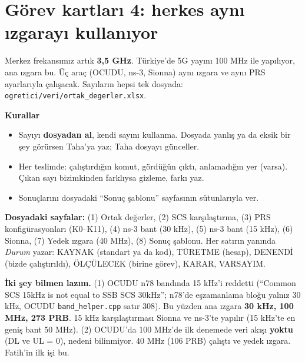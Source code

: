 \documentclass[11pt,a4paper]{article}
\begin{document}
\section*{Görev kartları 4: herkes aynı ızgarayı kullanıyor}
{\sffamily\color{muted} Merkez frekansımız artık \textbf{3,5 GHz}. Türkiye'de 5G yayını 100 MHz ile yapılıyor, ana ızgara bu. Üç araç (OCUDU, ns-3, Sionna) aynı ızgara ve aynı PRS ayarlarıyla çalışacak. Sayıların hepsi tek dosyada: \texttt{ogretici/veri/ortak\_degerler.xlsx}.}

\textbf{Kurallar}
\begin{itemize}[leftmargin=1.4em]
\item Sayıyı \textbf{dosyadan al}, kendi sayını kullanma. Dosyada yanlış ya da eksik bir şey görürsen Taha'ya yaz; Taha dosyayı günceller.
\item Her teslimde: çalıştırdığın komut, gördüğün çıktı, anlamadığın yer (varsa). Çıkan sayı bizimkinden farklıysa gizleme, farkı yaz.
\item Sonuçlarını dosyadaki ``Sonuç şablonu'' sayfasının sütunlarıyla ver.
\end{itemize}

\textbf{Dosyadaki sayfalar:} (1) Ortak değerler, (2) SCS karşılaştırma, (3) PRS konfigürasyonları (K0--K11), (4) ns-3 bant (30 kHz), (5) ns-3 bant (15 kHz), (6) Sionna, (7) Yedek ızgara (40 MHz), (8) Sonuç şablonu. Her satırın yanında \emph{Durum} yazar: KAYNAK (standart ya da kod), TÜRETME (hesap), DENENDİ (bizde çalıştırıldı), ÖLÇÜLECEK (birine görev), KARAR, VARSAYIM.

\begin{tcolorbox}[colback=warnl,colframe=warn,boxrule=0.5pt,arc=2pt]
\textbf{İki şey bilmen lazım.} (1) OCUDU n78 bandında 15 kHz'i reddetti (``Common SCS 15kHz is not equal to SSB SCS 30kHz''; n78'de eşzamanlama bloğu yalnız 30 kHz, OCUDU \texttt{band\_helper.cpp} satır 308). Bu yüzden ana ızgara \textbf{30 kHz, 100 MHz, 273 PRB}. 15 kHz karşılaştırması Sionna ve ns-3'te yapılır (15 kHz'te en geniş bant 50 MHz). (2) OCUDU'da 100 MHz'de ilk denemede veri akışı \textbf{yoktu} (DL ve UL = 0), nedeni bilinmiyor. 40 MHz (106 PRB) çalıştı ve yedek ızgara. Fatih'in ilk işi bu.
\end{tcolorbox}
\end{document}
